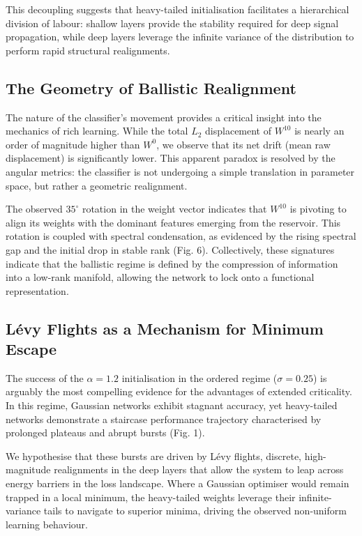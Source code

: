 \documentclass[11pt,a4paper]{article}
\begin{document}
This decoupling suggests that heavy-tailed initialisation facilitates a hierarchical division of labour: shallow layers provide the stability required for deep signal propagation, while deep layers leverage the infinite variance of the distribution to perform rapid structural realignments.

\subsection{The Geometry of Ballistic Realignment}

The nature of the classifier's movement provides a critical insight into the mechanics of rich learning. While the total $L_2$ displacement of $W^{10}$ is nearly an order of magnitude higher than $W^0$, we observe that its net drift (mean raw displacement) is significantly lower. This apparent paradox is resolved by the angular metrics: the classifier is not undergoing a simple translation in parameter space, but rather a geometric realignment.

The observed $35^\circ$ rotation in the weight vector indicates that $W^{10}$ is pivoting to align its weights with the dominant features emerging from the reservoir. This rotation is coupled with spectral condensation, as evidenced by the rising spectral gap and the initial drop in stable rank (Fig. 6). Collectively, these signatures indicate that the ballistic regime is defined by the compression of information into a low-rank manifold, allowing the network to lock onto a functional representation.

\subsection{Lévy Flights as a Mechanism for Minimum Escape}

The success of the $\alpha=1.2$ initialisation in the ordered regime ($\sigma=0.25$) is arguably the most compelling evidence for the advantages of extended criticality. In this regime, Gaussian networks exhibit stagnant accuracy, yet heavy-tailed networks demonstrate a staircase performance trajectory characterised by prolonged plateaus and abrupt bursts (Fig. 1).

We hypothesise that these bursts are driven by Lévy flights, discrete, high-magnitude realignments in the deep layers that allow the system to leap across energy barriers in the loss landscape. Where a Gaussian optimiser would remain trapped in a local minimum, the heavy-tailed weights leverage their infinite-variance tails to navigate to superior minima, driving the observed non-uniform learning behaviour.
\end{document}
